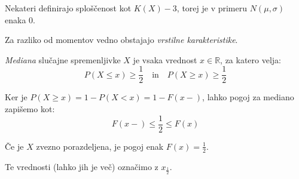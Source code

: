 \documentclass[12pt]{book}
\def\n{\noindent}
\def\s{\vspace{10pt}}
\theoremstyle{definition}
\theoremstyle{plain}
\theoremstyle{plain}
\theoremstyle{plain}
\theoremstyle{remark}
\begin{document}

Nekateri definirajo sploščenost kot $K(X) - 3$, torej je v primeru $N(\mu, \sigma)$ enaka 0. 

\s

Za razliko od momentov vedno obstajajo \emph{vrstilne karakteristike}.

\n \emph{Mediana} slučajne spremenljivke $X$ je vsaka vrednost $x \in \mathbb{R}$, za katero velja:
$$
P(X \leq x) \geq \frac{1}{2} \quad \text{in} \quad P(X \geq x) \geq\frac{1}{2}
$$

Ker je $P(X \geq x)=1-P(X<x)=1-F(x-)$, lahko pogoj za mediano zapišemo kot: 
$$
F(x-) \leq \frac{1}{2} \leq F(x)
$$

\n Če je $X$ zvezno porazdeljena, je pogoj enak $F(x) = \frac{1}{2}$.

\n Te vrednosti (lahko jih je več) označimo z $x_{\frac{1}{2}}$.
\end{document}

